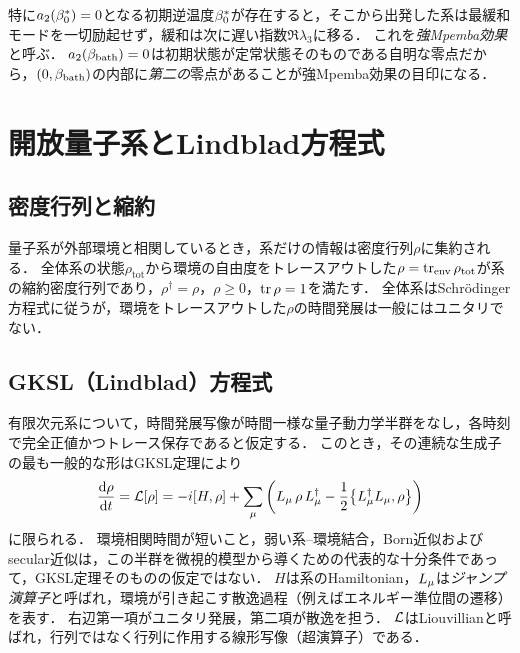 \documentclass[a4paper,11pt,onecolumn]{jlreq}
\begin{document}
特に$a_{2}(\beta_{0}^{*})=0$となる初期逆温度$\beta_{0}^{*}$が存在すると，そこから出発した系は最緩和モードを一切励起せず，緩和は次に遅い指数$\Re\lambda_3$に移る．
これを\emph{強Mpemba効果}と呼ぶ．
$a_{2}(\beta_{\mathrm{bath}})=0$は初期状態が定常状態そのものである自明な零点だから，$(0,\beta_{\mathrm{bath}})$の内部に\emph{第二の}零点があることが強Mpemba効果の目印になる．

\section{開放量子系とLindblad方程式}
\label{sec:lindblad}

\subsection{密度行列と縮約}
\label{sec:lindblad_rho}

量子系が外部環境と相関しているとき，系だけの情報は密度行列$\rho$に集約される．
全体系の状態$\rho_{\mathrm{tot}}$から環境の自由度をトレースアウトした$\rho=\tr_{\mathrm{env}}\rho_{\mathrm{tot}}$が系の縮約密度行列であり，$\rho^{\dagger}=\rho$，$\rho\ge0$，$\tr\rho=1$を満たす．
全体系はSchrödinger方程式に従うが，環境をトレースアウトした$\rho$の時間発展は一般にはユニタリでない．

\subsection{GKSL（Lindblad）方程式}
\label{sec:lindblad_gksl}

有限次元系について，時間発展写像が時間一様な量子動力学半群をなし，各時刻で完全正値かつトレース保存であると仮定する．
このとき，その連続な生成子の最も一般的な形はGKSL定理により
\begin{equation}
  \dv{\rho}{t} = \Lop[\rho]
  = -\ii\comm{H}{\rho}
    + \sum_{\mu}\left(\jump_\mu\,\rho\,\jump_\mu^{\dagger}
      - \frac{1}{2}\acomm{\jump_\mu^{\dagger}\jump_\mu}{\rho}\right)
  \label{eq:lindblad}
\end{equation}
に限られる\cite{Lindblad1976,Gorini1976}．
環境相関時間が短いこと，弱い系--環境結合，Born近似およびsecular近似は，この半群を微視的模型から導くための代表的な十分条件であって，GKSL定理そのものの仮定ではない．
$H$は系のHamiltonian，$L_\mu$は\emph{ジャンプ演算子}と呼ばれ，環境が引き起こす散逸過程（例えばエネルギー準位間の遷移）を表す．
右辺第一項がユニタリ発展，第二項が散逸を担う．
$\mathcal{L}$はLiouvillianと呼ばれ，行列ではなく行列に作用する線形写像（超演算子）である．
\end{document}

